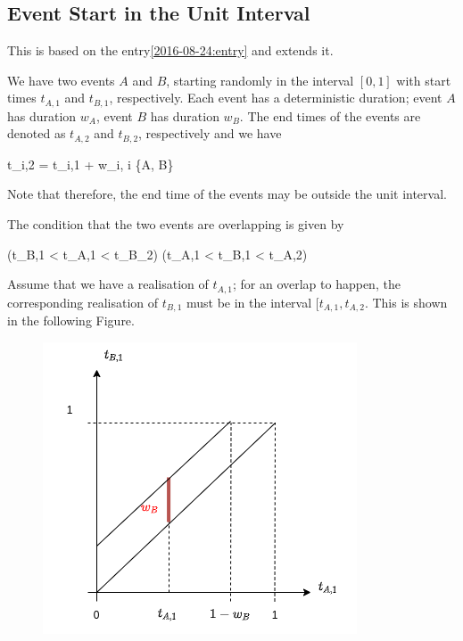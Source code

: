 
\subsection{Event Start in the Unit Interval}

This is based on the entry\ref{2016-08-24:entry} and extends it.


We have two events $A$ and $B$, starting randomly in the interval $[0,1]$ with start times $t_{A,1}$ and $t_{B,1}$, respectively. Each event has a deterministic duration; event $A$ has duration $w_A$, event $B$ has duration $w_B$. The end times of the events are denoted as $t_{A,2}$ and $t_{B,2}$, respectively and we have

\bee
t_{i,2} = t_{i,1} + w_i, \quad i \in \{A, B\}
\eee

Note that therefore, the end time of the events may be outside the unit interval.

The condition that the two events are overlapping is given by

\bee
(t_{B,1} < t_{A,1} < t_{B_2}) \vee (t_{A,1} < t_{B,1} < t_{A,2})
\eee

Assume that we have a realisation of $t_{A,1}$; for an overlap to happen, the corresponding realisation of $t_{B,1}$ must be in the interval $[t_{A,1}, t_{A,2}$. This is shown in the following Figure.

\begin{figure}[H]
    \centering
    \includegraphics[scale=0.75]{images/2021-12-21_conc_events_1.png}
\end{figure}

